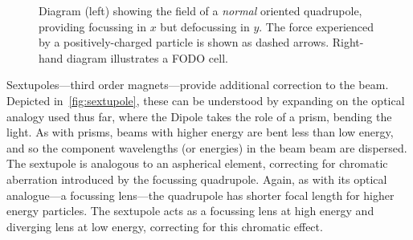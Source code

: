 \documentclass[11pt]{report}
\begin{document}
\begin{figure}
\caption{Diagram (left) showing the field of a \textit{normal} oriented quadrupole, providing focussing in $x$ but defocussing in $y$. The force experienced by a positively-charged particle is shown as dashed arrows. Right-hand diagram illustrates a FODO cell.}
\label{fig:quadrupole}
\end{figure}



Sextupoles---third order magnets---provide additional correction to the beam. Depicted in~\autoref{fig:sextupole}, these can be understood by expanding on the optical analogy used thus far, where the Dipole takes the role of a prism, bending the light. As with prisms, beams with higher energy are bent less than low energy, and so the component wavelengths (or energies) in the beam beam are dispersed. The sextupole is analogous to an aspherical element, correcting for chromatic aberration introduced by the focussing quadrupole. Again, as with its optical analogue---a focussing lens---the quadrupole has shorter focal length for higher energy particles. The sextupole acts as a focussing lens at high energy and diverging lens at low energy, correcting for this chromatic effect.
\end{document}
